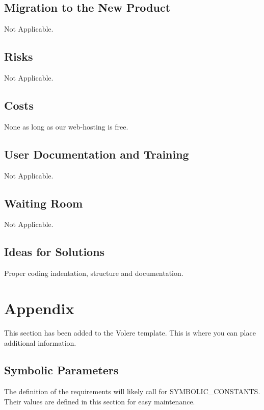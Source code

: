 \documentclass[12pt, titlepage]{article}
\begin{document}
    	\subsection{Migration to the New Product}
    	Not Applicable.

    	\subsection{Risks}
    	Not Applicable.

    	\subsection{Costs}
    	None as long as our web-hosting is free.

    	\subsection{User Documentation and Training}
    	Not Applicable.

    	\subsection{Waiting Room}
    	Not Applicable.

    	\subsection{Ideas for Solutions}
    	Proper coding indentation, structure and documentation.

	\newpage
    

    


    \section{Appendix}

    This section has been added to the Volere template.  This is where you can place
    additional information.

    \subsection{Symbolic Parameters}

    The definition of the requirements will likely call for SYMBOLIC\_CONSTANTS.
    Their values are defined in this section for easy maintenance.
\end{document}
